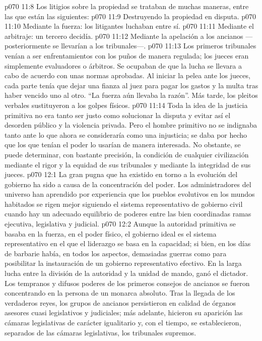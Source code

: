 \vs p070 11:8 \pc Los litigios sobre la propiedad se trataban de muchas maneras, entre las que están las siguientes:
\vs p070 11:9 Destruyendo la propiedad en disputa.
\vs p070 11:10 Mediante la fuerza: los litigantes luchaban entre sí.
\vs p070 11:11 Mediante el arbitraje: un tercero decidía.
\vs p070 11:12 Mediante la apelación a los ancianos ---posteriormente se llevarían a los tribunales---.
\vs p070 11:13 \pc Los primeros tribunales venían a ser enfrentamientos con los puños de manera regulada; los jueces eran simplemente evaluadores o árbitros. Se ocupaban de que la lucha se llevara a cabo de acuerdo con unas normas aprobadas. Al iniciar la pelea ante los jueces, cada parte tenía que dejar una fianza al juez para pagar los gastos y la multa tras haber vencido uno al otro. “La fuerza aún llevaba la razón”. Más tarde, los pleitos verbales sustituyeron a los golpes físicos.
\vs p070 11:14 Toda la idea de la justicia primitiva no era tanto ser justo como solucionar la disputa y evitar así el desorden público y la violencia privada. Pero el hombre primitivo no se indignaba tanto ante lo que ahora se consideraría como una injusticia; se daba por hecho que los que tenían el poder lo usarían de manera interesada. No obstante, se puede determinar, con bastante precisión, la condición de cualquier civilización mediante el rigor y la equidad de sus tribunales y mediante la integridad de sus jueces.
\vs p070 12:1 La gran pugna que ha existido en torno a la evolución del gobierno ha sido a causa de la concentración del poder. Los administradores del universo han aprendido por experiencia que los pueblos evolutivos en los mundos habitados se rigen mejor siguiendo el sistema representativo de gobierno civil cuando hay un adecuado equilibrio de poderes entre las bien coordinadas ramas ejecutiva, legislativa y judicial.
\vs p070 12:2 \pc Aunque la autoridad primitiva se basaba en la fuerza, en el poder físico, el gobierno ideal es el sistema representativo en el que el liderazgo se basa en la capacidad; si bien, en los días de barbarie había, en todos los aspectos, demasiadas guerras como para posibilitar la instauración de un gobierno representativo efectivo. En la larga lucha entre la división de la autoridad y la unidad de mando, ganó el dictador. Los tempranos y difusos poderes de los primeros consejos de ancianos se fueron concentrando en la persona de un monarca absoluto. Tras la llegada de los verdaderos reyes, los grupos de ancianos persistieron en calidad de órganos asesores cuasi legislativos y judiciales; más adelante, hicieron su aparición las cámaras legislativas de carácter igualitario y, con el tiempo, se establecieron, separados de las cámaras legislativas, los tribunales supremos.
